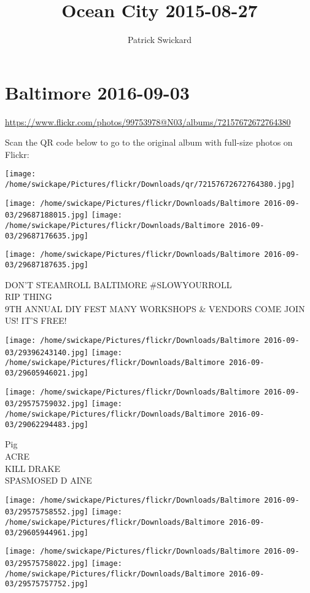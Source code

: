 \documentclass[10pt,letterpaper]{article}
\title{Ocean City 2015-08-27}
\author{Patrick Swickard}
\date{}
\begin{document}
\section*{Baltimore 2016-09-03}

\url{https://www.flickr.com/photos/99753978@N03/albums/72157672672764380}

Scan the QR code below to go to the original album with full-size photos on Flickr:

\texttt{[image: /home/swickape/Pictures/flickr/Downloads/qr/72157672672764380.jpg]}
\pagebreak

\texttt{[image: /home/swickape/Pictures/flickr/Downloads/Baltimore 2016-09-03/29687188015.jpg]}
\texttt{[image: /home/swickape/Pictures/flickr/Downloads/Baltimore 2016-09-03/29687176635.jpg]}

\vspace{0.25in}
\texttt{[image: /home/swickape/Pictures/flickr/Downloads/Baltimore 2016-09-03/29687187635.jpg]}

DON'T STEAMROLL BALTIMORE \#SLOWYOURROLL\\
RIP THING\\
9TH ANNUAL DIY FEST MANY WORKSHOPS \& VENDORS COME JOIN US!  IT'S FREE!
\pagebreak

\texttt{[image: /home/swickape/Pictures/flickr/Downloads/Baltimore 2016-09-03/29396243140.jpg]}
\texttt{[image: /home/swickape/Pictures/flickr/Downloads/Baltimore 2016-09-03/29605946021.jpg]}

\texttt{[image: /home/swickape/Pictures/flickr/Downloads/Baltimore 2016-09-03/29575759032.jpg]}
\texttt{[image: /home/swickape/Pictures/flickr/Downloads/Baltimore 2016-09-03/29062294483.jpg]}

Pig\\
ACRE\\
KILL DRAKE\\
SPASMOSED D AINE
\pagebreak

\texttt{[image: /home/swickape/Pictures/flickr/Downloads/Baltimore 2016-09-03/29575758552.jpg]}
\texttt{[image: /home/swickape/Pictures/flickr/Downloads/Baltimore 2016-09-03/29605944961.jpg]}

\texttt{[image: /home/swickape/Pictures/flickr/Downloads/Baltimore 2016-09-03/29575758022.jpg]}
\texttt{[image: /home/swickape/Pictures/flickr/Downloads/Baltimore 2016-09-03/29575757752.jpg]}
\end{document}
